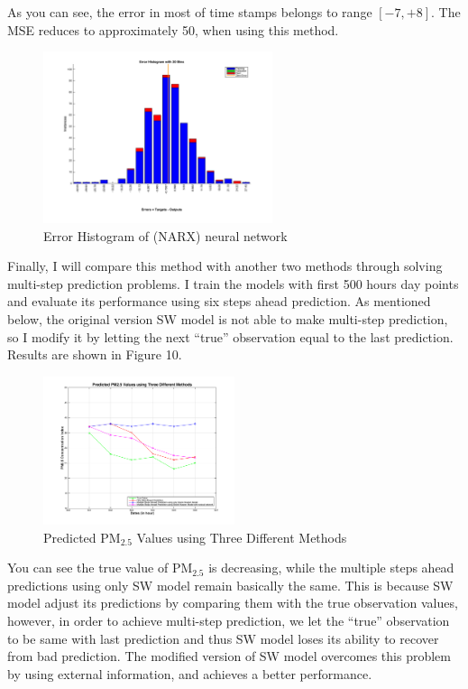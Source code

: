 \documentclass[letterpaper]{article}
\begin{document}
As you can see, the error in most of time stamps belongs to range $[ -7, +8]$. The MSE reduces to approximately 50, when using this method. 

\begin{figure}[htbp]
	\centerline{\includegraphics[width=0.60\textwidth]{PM25_h10d2_tsErrorHist.pdf}}
	\caption{Error Histogram of (NARX) neural network }\label{fig:digit}
\end{figure}

Finally, I will compare this method with another two methods through solving multi-step prediction problems. I train the models with first 500 hours day points and evaluate its performance using six steps ahead prediction. As mentioned below, the original version SW model is not able to make multi-step prediction, so I modify it by letting the next ``true'' observation equal to the last prediction. Results are shown in Figure 10.  

\begin{figure}[htbp]
	\centerline{\includegraphics[width=0.50\textwidth]{PM25_methods.pdf}}
	\caption{Predicted $\text{PM}_{2.5}$ Values using Three Different Methods }\label{fig:digit}
\end{figure}

You can see the true value of $\text{PM}_{2.5}$ is decreasing, while the multiple steps ahead predictions using only SW model remain basically the same. This is because SW model adjust its predictions by comparing them with the true observation values, however, in order to achieve multi-step prediction, we let the ``true'' observation to be same with last prediction and thus SW model loses its ability to recover from bad prediction. The modified version of SW model overcomes this problem by using external information, and achieves a better performance.
\end{document}

